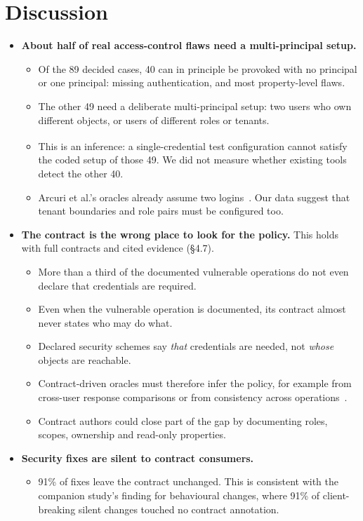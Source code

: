 \documentclass[conference]{IEEEtran}
\newcommand{\inferred}{\textsuperscript{\dag}}
\begin{document}
\section{Discussion}
\begin{itemize}
\item \textbf{About half of real access-control flaws need a multi-principal setup.}
\begin{itemize}
\item Of the 89 decided cases, 40 can in principle be provoked with no principal or one principal: missing authentication, and most property-level flaws.
\item The other 49 need a deliberate multi-principal setup: two users who own different objects, or users of different roles or tenants.
\item \inferred{} This is an inference: a single-credential test configuration cannot satisfy the coded setup of those 49. We did not measure whether existing tools detect the other 40.
\item Arcuri et al.'s oracles already assume two logins~\cite{arcuri2025access}. Our data suggest that tenant boundaries and role pairs must be configured too.
\end{itemize}
\item \textbf{The contract is the wrong place to look for the policy.} This holds with full contracts and cited evidence (\S{}4.7).
\begin{itemize}
\item More than a third of the documented vulnerable operations do not even declare that credentials are required.
\item Even when the vulnerable operation is documented, its contract almost never states who may do what.
\item Declared security schemes say \emph{that} credentials are needed, not \emph{whose} objects are reachable.
\item Contract-driven oracles must therefore infer the policy, for example from cross-user response comparisons or from consistency across operations~\cite{arcuri2025access}.
\item Contract authors could close part of the gap by documenting roles, scopes, ownership and read-only properties.
\end{itemize}
\item \textbf{Security fixes are silent to contract consumers.}
\begin{itemize}
\item 91\% of fixes leave the contract unchanged. This is consistent with the companion study's finding for behavioural changes, where 91\% of client-breaking silent changes touched no contract annotation.

\end{itemize}
\end{itemize}
\end{document}
